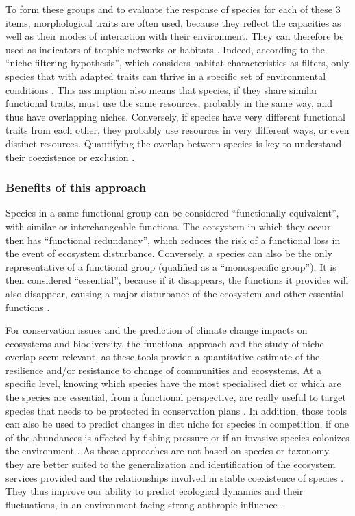 To form these groups and to evaluate the response of species for each of these 3 items, morphological traits are often used, because they reflect the capacities as well as their modes of interaction with their environment. They can therefore be used as indicators of trophic networks or habitats \citep{brindamour2016}. Indeed, according to the “niche filtering hypothesis”, which considers habitat characteristics as filters, only species that with adapted traits can thrive in a specific set of environmental conditions \citep{brindamour2011,zobel1997}. This assumption also means that species, if they share similar functional traits, must use the same resources, probably in the same way, and thus have overlapping niches. Conversely, if species have very different functional traits from each other, they probably use resources in very different ways, or even distinct resources. Quantifying the overlap between species is key to understand their coexistence or exclusion \citep{costa-pereira2019}.

\subsubsection{Benefits of this approach}

Species in a same functional group can be considered ``functionally equivalent'', with similar or interchangeable functions. The ecosystem in which they occur then has ``functional redundancy'', which reduces the risk of a functional loss in the event of ecosystem disturbance. Conversely, a species can also be the only representative of a functional group (qualified as a ``monospecific group''). It is then considered ``essential'', because if it disappears, the functions it provides will also disappear, causing a major disturbance of the ecosystem and other essential functions \citep{mejri2009}. 

For conservation issues and the prediction of climate change impacts on ecosystems and biodiversity, the functional approach and the study of niche overlap seem relevant, as these tools provide a quantitative estimate of the resilience and/or resistance to change of communities and ecosystems. 
 At a specific level, knowing which species have the most specialised diet or which are the species are essential, from a functional perspective, are really useful to target species that needs to be protected in conservation plans \citep{cooke2020,mejri2009,norton1995}. In addition, those tools can also be used to predict changes in diet niche for species in competition, if one of the abundances is affected by fishing pressure \citep{diderich2006} or if an invasive species colonizes the environment \citep{albouy2011,geange2011,nagelkerke2018}. As these approaches are not based on species or taxonomy, they are better suited to the generalization and identification of the ecosystem services provided \citep{martini2020,mcgill2006} and the relationships involved in stable coexistence of species \citep{albouy2011}. They thus improve our ability to predict ecological dynamics and their fluctuations, in an environment facing strong anthropic influence \citep{kremer2017}. 

